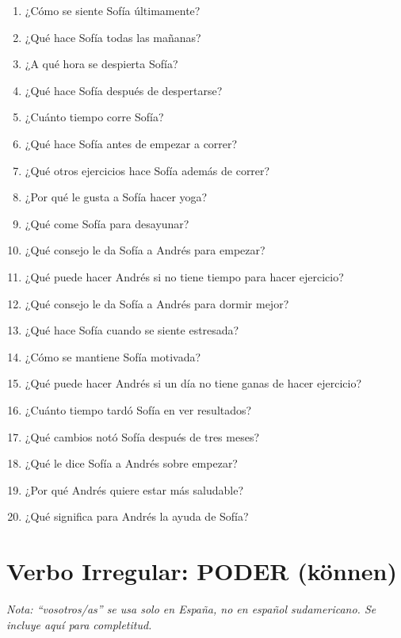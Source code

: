 \documentclass[12pt,a4paper]{article}
\begin{document}
\begin{enumerate}[leftmargin=*]
    \item ¿Cómo se siente Sofía últimamente?
    \item ¿Qué hace Sofía todas las mañanas?
    \item ¿A qué hora se despierta Sofía?
    \item ¿Qué hace Sofía después de despertarse?
    \item ¿Cuánto tiempo corre Sofía?
    \item ¿Qué hace Sofía antes de empezar a correr?
    \item ¿Qué otros ejercicios hace Sofía además de correr?
    \item ¿Por qué le gusta a Sofía hacer yoga?
    \item ¿Qué come Sofía para desayunar?
    \item ¿Qué consejo le da Sofía a Andrés para empezar?
    \item ¿Qué puede hacer Andrés si no tiene tiempo para hacer ejercicio?
    \item ¿Qué consejo le da Sofía a Andrés para dormir mejor?
    \item ¿Qué hace Sofía cuando se siente estresada?
    \item ¿Cómo se mantiene Sofía motivada?
    \item ¿Qué puede hacer Andrés si un día no tiene ganas de hacer ejercicio?
    \item ¿Cuánto tiempo tardó Sofía en ver resultados?
    \item ¿Qué cambios notó Sofía después de tres meses?
    \item ¿Qué le dice Sofía a Andrés sobre empezar?
    \item ¿Por qué Andrés quiere estar más saludable?
    \item ¿Qué significa para Andrés la ayuda de Sofía?
\end{enumerate}

\newpage

\section*{Verbo Irregular: PODER (können)}

\textit{Nota: \enquote{vosotros/as} se usa solo en España, no en español sudamericano. Se incluye aquí para completitud.}
\end{document}
